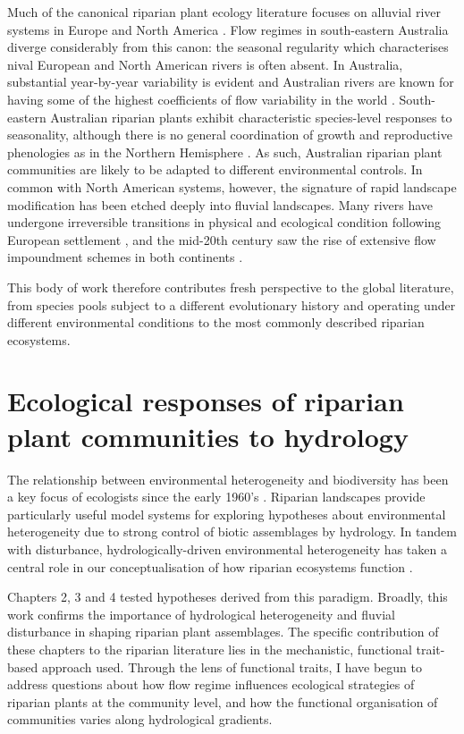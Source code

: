 \documentclass[openright,12pt,a4paper]{memoir}
\begin{document}
Much of the canonical riparian plant ecology literature focuses on alluvial river systems in Europe and North America \citep{Nilsson1989, Naiman1997, Tabacchi1998, Naiman2005, Corenblit2007}. Flow regimes in south-eastern Australia diverge considerably from this canon: the seasonal regularity which characterises nival European and North American rivers is often absent. In Australia, substantial year-by-year variability is evident and Australian rivers are known for having some of the highest coefficients of flow variability in the world \citep{Peel2004, Rustomji2009}. South-eastern Australian riparian plants exhibit characteristic species-level responses to seasonality, although there is no general coordination of growth and reproductive phenologies as in the Northern Hemisphere \citep{Ford1979}. As such, Australian riparian plant communities are likely to be adapted to different environmental controls. In common with North American systems, however, the signature of rapid landscape modification has been etched deeply into fluvial landscapes. Many rivers have undergone irreversible transitions in physical and ecological condition following European settlement \citep{Knopf1988, Fleischner1994, Wasson1994, Brierley1999}, and the mid-20th century saw the rise of extensive flow impoundment schemes in both continents \citep{Lloyd2004, Graf2006}.

This body of work therefore contributes fresh perspective to the global literature, from species pools subject to a different evolutionary history and operating under different environmental conditions to the most commonly described riparian ecosystems.

\section{Ecological responses of riparian plant communities to hydrology}
The relationship between environmental heterogeneity and biodiversity has been a key focus of ecologists since the early 1960’s \citep{MacArthur1961, Stein2014}. Riparian landscapes provide particularly useful model systems for exploring hypotheses about environmental heterogeneity due to strong control of biotic assemblages by hydrology. In tandem with disturbance, hydrologically-driven environmental heterogeneity has taken a central role in our conceptualisation of how riparian ecosystems function \citep{Poff1997, Naiman2005}.

Chapters 2, 3 and 4 tested hypotheses derived from this paradigm. Broadly, this work confirms the importance of hydrological heterogeneity and fluvial disturbance in shaping riparian plant assemblages. The specific contribution of these chapters to the riparian literature lies in the mechanistic, functional trait-based approach used. Through the lens of functional traits, I have begun to address questions about how flow regime influences ecological strategies of riparian plants at the community level, and how the functional organisation of communities varies along hydrological gradients.
\end{document}
